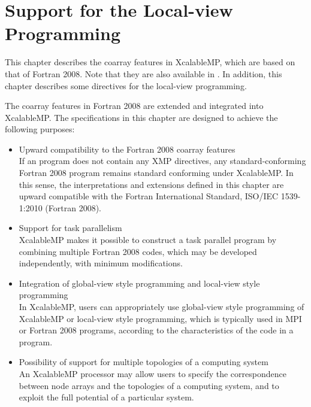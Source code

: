 \chapter{Support for the Local-view Programming}
\label{chap:Support for the Local-view Programming}

This chapter describes the coarray features in XcalableMP, which are based on
that of Fortran 2008. Note that they are also available
in {\XMPC}. In addition, this chapter describes some directives for the local-view programming.


The coarray features in Fortran 2008 are extended and integrated into
XcalableMP. The specifications in this chapter are designed to achieve
the following purposes:

\begin{itemize}
 \item Upward compatibility to the Fortran 2008 coarray features\\
If an {\XMPF} program does not contain any XMP directives,
any standard-conforming Fortran 2008 program
remains standard conforming under XcalableMP.
In this sense, the interpretations and extensions defined in this
 chapter are upward compatible with the Fortran International Standard, ISO/IEC 1539-1:2010 (Fortran 2008).

 \item Support for task parallelism \\
       XcalableMP makes it possible to construct a task parallel program by
       combining multiple Fortran 2008 codes, which may be developed
       independently, with minimum modifications.

 \item Integration of global-view style programming and local-view style programming\\
       In XcalableMP, users can appropriately use global-view style
       programming of 
       XcalableMP or local-view style programming, which is typically
       used in MPI or Fortran 2008 programs, according to
       the characteristics of the code in a program.

 \item Possibility of support for multiple topologies of a computing system\\
       An XcalableMP processor may allow users to specify the correspondence between 
       node arrays and the topologies of a computing system, and to
       exploit the full potential of a particular system.

\end{itemize}


